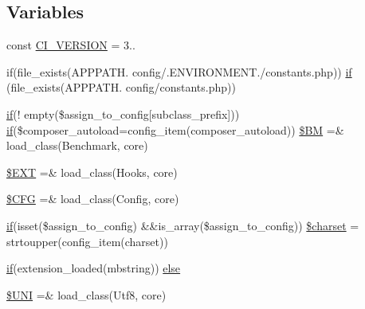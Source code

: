 \subsection*{Variables}
\begin{DoxyCompactItemize}
\item 
const \mbox{\hyperlink{_code_igniter_8php_a32e3c3927ba8ec93df92327dfd85d564}{C\+I\+\_\+\+V\+E\+R\+S\+I\+ON}} = \textquotesingle{}3..\textquotesingle{}
\item 
if(file\+\_\+exists(A\+P\+P\+P\+A\+T\+H. \textquotesingle{}config/\textquotesingle{}.E\+N\+V\+I\+R\+O\+N\+M\+E\+N\+T.\textquotesingle{}/constants.\+php\textquotesingle{})) \mbox{\hyperlink{_code_igniter_8php_a565ae1002e1468af84434f86276c519e}{if}} (file\+\_\+exists(A\+P\+P\+P\+A\+T\+H. \textquotesingle{}config/constants.\+php\textquotesingle{}))
\item 
\mbox{\hyperlink{_test_test_8php_a107bc088eea0dce8972b45c841f5ff9c}{if}}(! empty(\$assign\+\_\+to\+\_\+config\mbox{[}\textquotesingle{}subclass\+\_\+prefix\textquotesingle{}\mbox{]})) \mbox{\hyperlink{_test_test_8php_a107bc088eea0dce8972b45c841f5ff9c}{if}}(\$composer\+\_\+autoload=config\+\_\+item(\textquotesingle{}composer\+\_\+autoload\textquotesingle{})) \mbox{\hyperlink{_code_igniter_8php_a13e4265227a370a54765a330eaa5b111}{\$\+BM}} =\& load\+\_\+class(\textquotesingle{}Benchmark\textquotesingle{}, \textquotesingle{}core\textquotesingle{})
\item 
\mbox{\hyperlink{_code_igniter_8php_ab97aae9bc0aae04b84d360a29a3c035b}{\$\+E\+XT}} =\& load\+\_\+class(\textquotesingle{}Hooks\textquotesingle{}, \textquotesingle{}core\textquotesingle{})
\item 
\mbox{\hyperlink{_code_igniter_8php_adb9373e11e42b2cd55d1fe249ae72deb}{\$\+C\+FG}} =\& load\+\_\+class(\textquotesingle{}Config\textquotesingle{}, \textquotesingle{}core\textquotesingle{})
\item 
\mbox{\hyperlink{_test_test_8php_a107bc088eea0dce8972b45c841f5ff9c}{if}}(isset(\$assign\+\_\+to\+\_\+config) \&\&is\+\_\+array(\$assign\+\_\+to\+\_\+config)) \mbox{\hyperlink{_code_igniter_8php_a7e7d4efeadded7c1817a6313303f81f4}{\$charset}} = strtoupper(config\+\_\+item(\textquotesingle{}charset\textquotesingle{}))
\item 
\mbox{\hyperlink{_test_test_8php_a107bc088eea0dce8972b45c841f5ff9c}{if}}(extension\+\_\+loaded(\textquotesingle{}mbstring\textquotesingle{})) \mbox{\hyperlink{_code_igniter_8php_a6574dda0394726f334fcb9695654b02e}{else}}
\item 
\mbox{\hyperlink{_code_igniter_8php_a2060dabd8d00b5b0539bd041bf450924}{\$\+U\+NI}} =\& load\+\_\+class(\textquotesingle{}Utf8\textquotesingle{}, \textquotesingle{}core\textquotesingle{})

\end{DoxyCompactItemize}
